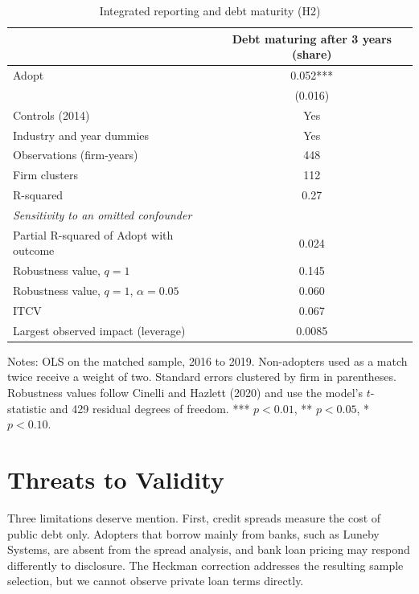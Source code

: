 \documentclass[11pt]{article}
\begin{document}
\begin{table}[!htbp]
\centering
\begin{threeparttable}
\caption{Integrated reporting and debt maturity (H2)}
\label{tab:maturity}
\small
\begin{tabular}{lc}
\toprule
 & Debt maturing after 3 years (share) \\
\midrule
Adopt & 0.052*** \\
 & (0.016) \\
Controls (2014) & Yes \\
Industry and year dummies & Yes \\
\midrule
Observations (firm-years) & 448 \\
Firm clusters & 112 \\
R-squared & 0.27 \\
\midrule
\multicolumn{2}{l}{\textit{Sensitivity to an omitted confounder}} \\
Partial R-squared of Adopt with outcome & 0.024 \\
Robustness value, $q=1$ & 0.145 \\
Robustness value, $q=1$, $\alpha=0.05$ & 0.060 \\
ITCV & 0.067 \\
Largest observed impact (leverage) & 0.0085 \\
\bottomrule
\end{tabular}
\begin{tablenotes}\footnotesize
\item Notes: OLS on the matched sample, 2016 to 2019. Non-adopters used as a match twice receive a weight of two. Standard errors clustered by firm in parentheses. Robustness values follow Cinelli and Hazlett (2020) and use the model's $t$-statistic and 429 residual degrees of freedom. *** $p<0.01$, ** $p<0.05$, * $p<0.10$.
\end{tablenotes}
\end{threeparttable}
\end{table}

\section{Threats to Validity}

Three limitations deserve mention. First, credit spreads measure the cost of public debt only. Adopters that borrow mainly from banks, such as Luneby Systems, are absent from the spread analysis, and bank loan pricing may respond differently to disclosure. The Heckman correction addresses the resulting sample selection, but we cannot observe private loan terms directly.
\end{document}
